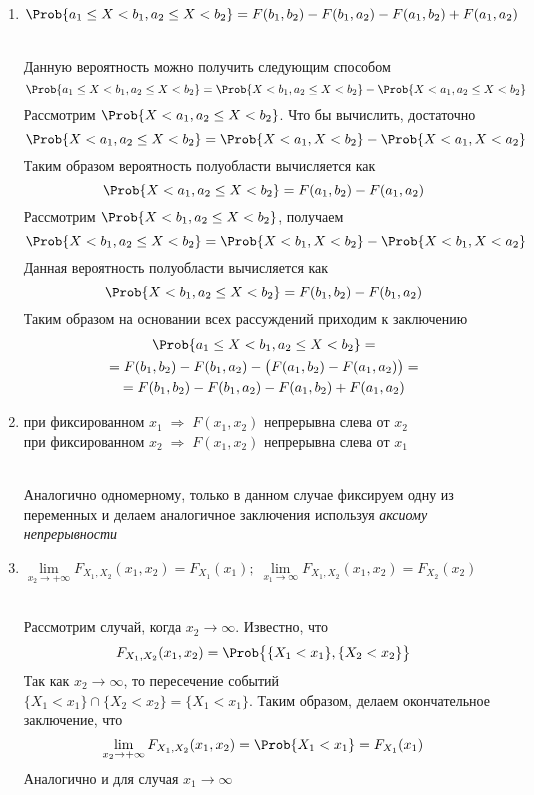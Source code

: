 \begin{enumerate}
	\item $\Prob\{ a_1 \leq X < b_1, a_2 \leq X < b_2 \} = F(b_1, b_2) - F(b_1, a_2) - F(a_1, b_2) + F(a_1, a_2)$
	\begin{Proof}\\
		Данную вероятность можно получить следующим способом
		\[
			\Prob\{ a_1 \leq X < b_1, a_2 \leq X < b_2 \} = \Prob\{ X < b_1, a_2 \leq X < b_2 \} - \Prob\{ X < a_1, a_2 \leq X < b_2 \}
		\]
		Рассмотрим $\Prob\{ X < a_1, a_2 \leq X < b_2 \}$. Что бы вычислить, достаточно
		\[
			\Prob\{ X < a_1, a_2 \leq X < b_2 \} = \Prob\{ X < a_1, X < b_2 \} - \Prob\{ X < a_1, X < a_2 \}
		\]
		Таким образом вероятность полуобласти вычисляется как
		\[
			\Prob\{ X < a_1, a_2 \leq X < b_2 \} = F(a_1, b_2) - F(a_1, a_2)
		\]
		Рассмотрим $\Prob\{ X < b_1, a_2 \leq X < b_2 \}$, получаем
		\[
			\Prob\{ X < b_1, a_2 \leq X < b_2 \} = \Prob\{ X < b_1, X < b_2 \} - \Prob\{ X < b_1, X < a_2 \}
		\]
		Данная вероятность полуобласти вычисляется как
		\[
			\Prob\{ X < b_1, a_2 \leq X < b_2 \} = F(b_1, b_2) - F(b_1, a_2)
		\]
		Таким образом на основании всех рассуждений приходим к заключению
		\begin{multline*}
			\Prob\{ a_1 \leq X < b_1, a_2 \leq X < b_2 \} = \\
			= F(b_1, b_2) - F(b_1, a_2) - \bigl(F(a_1, b_2) - F(a_1, a_2)\bigr) = \\
			= F(b_1, b_2) - F(b_1, a_2) - F(a_1, b_2) + F(a_1, a_2)
		\end{multline*}
	\end{Proof}
	
	\item при фиксированном $x_1 \;\Rightarrow\; F(x_1, x_2)$ непрерывна слева от $x_2$\\
	при фиксированном $x_2 \;\Rightarrow\; F(x_1, x_2)$ непрерывна слева от $x_1$
	\begin{Proof}\\
		Аналогично одномерному, только в данном случае фиксируем одну из переменных и делаем аналогичное заключения используя \textit{аксиому непрерывности}\\
	\end{Proof}
	
	\item $\lim\limits_{x_2 \to +\infty} F_{X_1, X_2}(x_1, x_2) = F_{X_1}(x_1);\; \lim\limits_{x_1 \to \infty} F_{X_1, X_2}(x_1, x_2) = F_{X_2}(x_2)$
	\begin{Proof}\\
		Рассмотрим случай, когда $x_2 \to \infty$. Известно, что
		\[
			F_{X_1, X_2}(x_1, x_2) = \Prob\bigl\{ \{ X_1 < x_1 \}, \{ X_2 < x_2 \} \bigr\}
		\]
		Так как $x_2 \to \infty$, то пересечение событий $\{ X_1 < x_1 \} \cap \{ X_2 < x_2 \} = \{ X_1 < x_1 \}$. Таким образом, делаем окончательное заключение, что
		\[
			\lim\limits_{x_2 \to +\infty} F_{X_1, X_2}(x_1, x_2) = \Prob\{ X_1 < x_1 \} = F_{X_1}(x_1)
		\]
		Аналогично и для случая $x_1 \to \infty$\\
	\end{Proof}
\end{enumerate}





